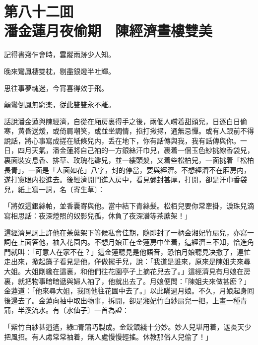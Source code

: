 
\chapter*{第八十二囬　\\潘金蓮月夜偷期　陳經濟畫樓雙美}


\begin{myquote}
記得書齋乍會時，雲蹤雨跡少人知。

晚來鸞鳳棲雙枕，剔盡銀燈半吐輝。

思往事夢魂迷，今宵喜得效于飛。

顛鸞倒鳳無窮楽，従此雙雙永不離。
\end{myquote}

話說潘金蓮與陳經濟，自從在廂房裏得手之後，兩個人嚐着甜頭兒，日逐白日偷寒，黄昏送煖，或倚肩嘲笑，或並坐調情，掐打揪撏，通無忌憚。或有人跟前不得說話，將心事寫成搓在紙條兒内，丢在地下，你有話傳與我，我有話傳與你。一日，四月天氣，潘金蓮將自己袖的一方銀絲汗巾兒，裹着一個玉色紗挑線香袋兒，裏面裝安息香、排草、玫瑰花瓣兒，並一縷頭髮，又着些松柏兒，一面挑着「松柏長青」，一面是「人面如花」八字，封的停當，要與經濟。不想經濟不在廂房内，遂打窻眼内投進去。後經濟開門進入房中，看見彌封甚厚，打開，卻是汗巾香袋兒，紙上寫一詞，名〔寄生草〕：

\begin{myquote}
「將奴這銀絲帕，並香囊寄與他。當中結下青絲髮。松栢兒要你常牽掛，淚珠兒滴寫相思話：夜深燈照的奴影兒孤，休負了夜深潛等茶䕷架！」
\end{myquote}

這經濟見詞上許他在荼䕷架下等候私會佳期，隨即封了一柄金湘妃竹扇兒，亦寫一詞在上面答他，袖入花園内。不想月娘正在金蓮房中坐着，這經濟三不知，恰進角門就叫：「可意人在家不在？」這金蓮聽見是他語音，恐怕月娘聽見决撒了，連忙走出來，掀起簾子看見是他，佯做擺手兒，說：「我道是誰來，原來是陳姐夫來尋大姐。大姐剛纔在這裏，和他們往花園亭子上摘花兒去了。」這經濟見有月娘在房裏，就把物事暗暗遞與婦人袖了，他就出去了。月娘便問：「陳姐夫來做甚麽？」金蓮道：「他來尋大姐，我囘他往花園中去了。」以此瞞過月娘。不久，月娘起身囘後邊去了。金蓮向袖中取出物事，拆開，卻是湘妃竹白紗扇兒一把，上畫一種青蒲，半溪流水。有〔水仙子〕一首為證：

\begin{myquote}
「紫竹白紗甚逍遙，綠□青蒲巧製成。金鉸銀綫十分妙。妙人兒堪用着，遮炎天少把風招。有人䖏常常袖着，無人處慢慢輕搖。休教那俗人兒偷了！」
\end{myquote}

